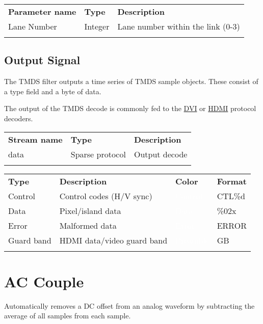 \begin{tabularx}{16cm}{llX}
\thickhline
\textbf{Parameter name} & \textbf{Type} & \textbf{Description} \\
\thinhline
Lane Number & Integer & Lane number within the link (0-3)\\
\thickhline
\end{tabularx}

\subsection{Output Signal}

The TMDS filter outputs a time series of TMDS sample objects. These consist of a type field and a byte of data.

The output of the TMDS decode is commonly fed to the \hyperref[filter:dvi]{DVI} or \hyperref[filter:hdmi]{HDMI}
protocol decoders.

\begin{tabularx}{16cm}{llX}
\thickhline
\textbf{Stream name} & \textbf{Type} & \textbf{Description} \\
\thickhline
data & Sparse protocol & Output decode \\
\thickhline
\end{tabularx}

\begin{tabularx}{16cm}{lllX}
\thickhline
\textbf{Type} & \textbf{Description} & \textbf{Color} & \textbf{Format} \\
\thickhline
Control & Control codes (H/V sync) & \cellcolor{control}\textcolor{white}{Control} & CTL\%d \\
\thinhline
Data & Pixel/island data & \cellcolor{data}\textcolor{white}{Data} & \%02x \\
\thinhline
Error & Malformed data & \cellcolor{error}\textcolor{white}{Error} & ERROR \\
\thinhline
Guard band & HDMI data/video guard band & \cellcolor{preamble}\textcolor{white}{Preamble} & GB \\
\thickhline
\end{tabularx}

\pagebreak
\section{AC Couple}
\label{filter:accouple}

Automatically removes a DC offset from an analog waveform by subtracting the average of all samples from each sample.

